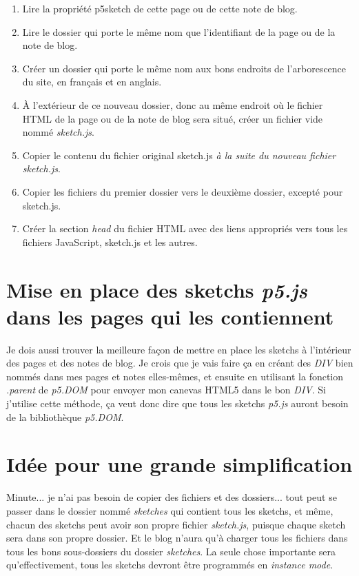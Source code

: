 \begin{enumerate}  
\item Lire la propriété p5sketch de cette page ou de cette note de blog.
\item Lire le dossier qui porte le même nom que l'identifiant de la page ou de la note de blog.
\item Créer un dossier qui porte le même nom aux bons endroits de l'arborescence du site, en français et en anglais.
\item À l'extérieur de ce nouveau dossier, donc au même endroit où le fichier HTML de la page ou de la note de blog sera situé, créer un fichier vide nommé \textit{sketch.js}.
\item Copier le contenu du fichier original sketch.js \textit{à la suite du nouveau fichier sketch.js}.
\item Copier les fichiers du premier dossier vers le deuxième dossier, excepté pour sketch.js.
\item Créer la section \textit{head} du fichier HTML avec des liens appropriés vers tous les fichiers JavaScript, sketch.js et les autres.
\end{enumerate}

\section{Mise en place des sketchs \textit{p5.js} dans les pages qui les contiennent}
Je dois aussi trouver la meilleure façon de mettre en place les sketchs à l'intérieur des pages et des notes de blog. Je crois que je vais faire ça en créant des \textit{DIV} bien nommés dans mes pages et notes elles-mêmes, et ensuite en utilisant la fonction \textit{.parent} de \textit{p5.DOM} pour envoyer mon canevas HTML5 dans le bon \textit{DIV}. Si j'utilise cette méthode, ça veut donc dire que tous les sketchs \textit{p5.js} auront besoin de la bibliothèque \textit{p5.DOM}.

\newpage
\section{Idée pour une grande simplification}
Minute... je n'ai pas besoin de copier des fichiers et des dossiers... tout peut se passer dans le dossier nommé \textit{sketches} qui contient tous les sketchs, et même, chacun des sketchs peut avoir son propre fichier \textit{sketch.js}, puisque chaque sketch sera dans son propre dossier. Et le blog n'aura qu'à charger tous les fichiers dans tous les bons sous-dossiers du dossier \textit{sketches}. La seule chose importante sera qu'effectivement, tous les sketchs devront être programmés en \textit{instance mode}.

